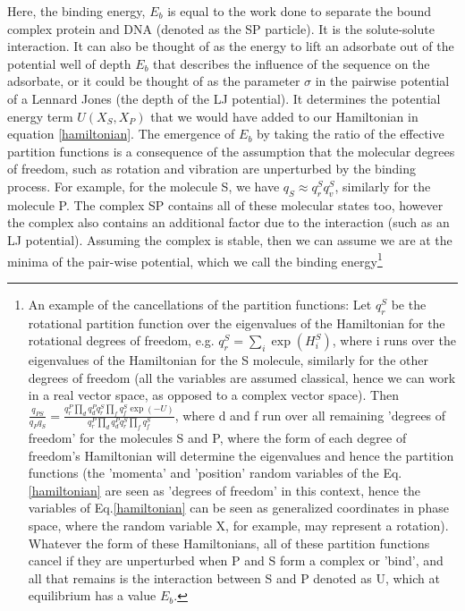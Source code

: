 Here, the binding energy, $E_b$ is equal to the work done to separate the bound complex protein and DNA (denoted as the SP particle). It is the solute-solute interaction.  It can also be thought of as the energy to lift an adsorbate out of the potential well of depth $E_b$ that describes the influence of the sequence on the adsorbate, or it could be thought of as the parameter $\sigma$ in the pairwise potential of a Lennard Jones (the depth of the LJ potential).  It determines the potential energy term $U(X_S,X_P)$ that we would have added to our Hamiltonian in equation \eqref{hamiltonian}.  The emergence of $E_b$ by taking the ratio of the effective partition functions is a consequence of the assumption that the molecular degrees of freedom, such as rotation and vibration are unperturbed by the binding process.  For example, for the molecule S, we have $q_S \approx q_r^S q_v^S$, similarly for the molecule P.  The complex SP contains all of these molecular states too, however the complex also contains an additional factor due to the interaction (such as an LJ potential).  Assuming the complex is stable, then we can assume we are at the minima of the pair-wise potential, which we call the binding energy\footnote{ An example of the cancellations of the partition functions: Let $q_r^S$ be the rotational partition function over the eigenvalues of the Hamiltonian for the rotational degrees of freedom, e.g. $q_r^S=\sum_i \exp( H_i^S )$, where i runs over the eigenvalues of the Hamiltonian for the S molecule, similarly for the other degrees of freedom (all the variables are assumed classical, hence we can work in a real vector space, as opposed to a complex vector space).  Then $\frac{q_{PS}}{q_P q_S}= \frac{q_r^P \prod_d q_d^P q_r^S \prod_f q_f^S \exp(-U)}{q_r^P \prod_d q_d^P q_r^S \prod_f q_f^S }$, where d and f run over all remaining 'degrees of freedom' for the molecules S and P, where the form of each degree of freedom's Hamiltonian will determine the eigenvalues and hence the partition functions (the 'momenta' and 'position' random variables of the Eq.\ref{hamiltonian} are seen as 'degrees of freedom'\cite{hobson} in this context, hence the variables of Eq.\ref{hamiltonian} can be seen as generalized coordinates in phase space, where the random variable X, for example, may represent a rotation).  Whatever the form of these Hamiltonians, all of these partition functions cancel if they are unperturbed when P and S form a complex or 'bind', and all that remains is the interaction between S and P denoted as U, which at equilibrium has a value $E_b$.  } 

